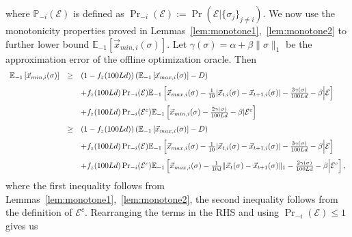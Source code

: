 \documentclass[]{article}
\newcommand{\Eover}[2]{\mathbb{E}_{#1}\left[#2\right]}
\newcommand{\x}{\vec{x}}
\theoremstyle{definition}
\begin{document}
where $\mathbb{P}_{-i}(\mathcal{E})$ is defined as $\Pr_{-i}(\mathcal{E}) := \Pr\left(\mathcal{E}\Big| \{\sigma_{j}\}_{j\neq i}\right).$ We now use the monotonicity properties proved in Lemmas~\ref{lem:monotone1},~\ref{lem:monotone2} to further lower bound $\Eover{-1}{\x_{min,i}(\sigma)}$. Let $\gamma(\sigma) = \alpha + \beta \|\sigma\|_{1}$ be the approximation error of the offline optimization oracle. Then
\begingroup\makeatletter\def\f@size{10}\check@mathfonts
\begin{equation*}
    \begin{array}{lll}
         \Eover{-1}{\x_{min,i}(\sigma)} &\geq&  \left(1-f_z(100Ld)\right)(\Eover{-1}{\x_{max, i}(\sigma)}-D)\vspace{0.1in}\\
         && + f_z(100Ld)\Pr_{-i}(\mathcal{E})\Eover{-1}{\x_{max,i}(\sigma) -\frac{1}{10}|\x_{t,i}(\sigma) - \x_{t+1,i}(\sigma)| - \frac{3\gamma(\sigma)}{100Ld}-\beta \Big| \mathcal{E}}\vspace{0.1in}\\
         && + f_z(100Ld)\Pr_{-i}(\mathcal{E}^c)\Eover{-1}{\x_{min,i}(\sigma) - \frac{2\gamma(\sigma)}{100Ld}-\beta| \mathcal{E}^c}\vspace{0.1in}\\
         &\geq& \left(1-f_z(100Ld)\right)(\Eover{-1}{\x_{max, i}(\sigma)}-D)\vspace{0.1in}\\
         && + f_z(100Ld)\Pr_{-i}(\mathcal{E})\Eover{-1}{\x_{max,i}(\sigma) -\frac{1}{10}|\x_{t,i}(\sigma) - \x_{t+1,i}(\sigma)|-\frac{3\gamma(\sigma)}{100Ld} -\beta\Big| \mathcal{E}}\vspace{0.1in}\\
         && + f_z(100Ld)\Pr_{-i}(\mathcal{E}^c)\Eover{-1}{\x_{max,i}(\sigma)-\frac{1}{10d}\|\x_{t}(\sigma)-\x_{t+1}(\sigma)\|_1 - \frac{2\gamma(\sigma)}{100Ld} -\beta\Big| \mathcal{E}^c},
    \end{array}
\end{equation*}
\endgroup
where the first inequality follows from Lemmas~\ref{lem:monotone1},~\ref{lem:monotone2}, the second inequality follows from the definition of $\mathcal{E}^c$. Rearranging the terms in the RHS and using $\Pr_{-i}(\mathcal{E}) \leq 1$ gives us 
\end{document}
